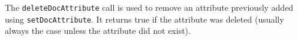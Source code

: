 The \verb+deleteDocAttribute+ call is used to remove an attribute previously added using
\verb+setDocAttribute+. It returns true if the attribute was deleted (usually always the case unless
the attribute did not exist).
